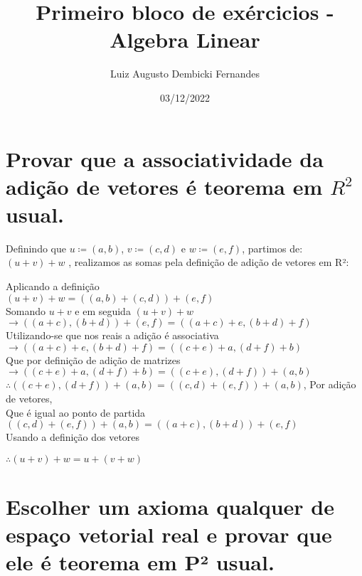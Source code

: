 \documentclass[12pt, twoside, a4]{article} %
\begin{document}
\title{Primeiro bloco de exércicios - Algebra Linear}
\author{Luiz Augusto Dembicki Fernandes}
\date{03/12/2022}
\maketitle

\section{Provar que a associatividade da adição de vetores é teorema em $ R^2 $ usual.}

Definindo que $ u \coloneqq (a, b)$, $v  \coloneqq  (c, d)$ e $w  \coloneqq  (e, f)$, partimos de:
$ (u + v) + w $ , realizamos as somas pela definição de adição de vetores em R²:
\begin{center}
\begin{doublespacing}
    
Aplicando a definição \\ 
$ (u + v) + w = ((a, b) + (c, d)) + (e, f)$ \\
Somando $u + v$ e em seguida $ (u + v) + w$ \\
$ \to ((a + c), (b + d)) + (e, f) =  ((a + c) + e, (b + d) + f)$ \\
Utilizando-se que nos reais a adição é associativa \\
$ \to ((a + c) + e, (b + d) + f) = ((c + e) + a, (d + f) + b)$ \\
Que por definição de adição de matrizes \\
$ \to  ((c + e) + a, (d + f) + b) = ((c + e), (d + f)) + (a, b)$ \\
$ \therefore ((c + e), (d + f)) + (a, b) = ((c, d) + (e, f)) + (a, b)$, Por adição de vetores, \\
Que é igual ao ponto de partida \\
$ ((c, d) + (e, f)) + (a, b) =  ((a + c), (b + d)) + (e, f)$ \\
Usando a definição dos vetores \\
\end{doublespacing}
$ \therefore (u + v) + w = u + (v + w) $

\end{center}

\section{Escolher um axioma qualquer de espaço vetorial real e provar que ele é teorema em P² usual.}
\end{document}
